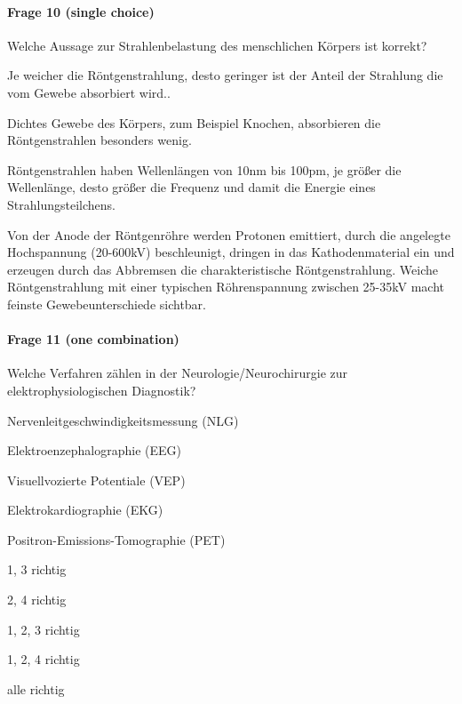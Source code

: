 \paragraph{Frage 10 (single choice)}

Welche Aussage zur Strahlenbelastung des menschlichen Körpers ist korrekt?
\begin{benumerate}
  \item Je weicher die Röntgenstrahlung, desto geringer ist der Anteil der Strahlung die vom Gewebe absorbiert wird..
  \item Dichtes Gewebe des Körpers, zum Beispiel Knochen, absorbieren die Röntgenstrahlen besonders wenig.
  \item Röntgenstrahlen haben Wellenlängen von 10nm bis 100pm, je größer die Wellenlänge, desto größer die Frequenz und damit die Energie eines Strahlungsteilchens.
  \item Von der Anode der Röntgenröhre werden Protonen emittiert, durch die angelegte Hochspannung (20-600kV) beschleunigt, dringen in das Kathodenmaterial ein und erzeugen durch das Abbremsen die charakteristische Röntgenstrahlung.
  \bolditem Weiche Röntgenstrahlung mit einer typischen Röhrenspannung zwischen 25-35kV macht feinste Gewebeunterschiede sichtbar.
\end{benumerate}

\paragraph{Frage 11 (one combination)}

Welche Verfahren zählen in der Neurologie/Neurochirurgie zur elektrophysiologischen Diagnostik?

\begin{minipage}{.7\linewidth}
  \begin{benumerate}
    \item Nervenleitgeschwindigkeitsmessung (NLG)
    \item Elektroenzephalographie (EEG)
    \item Visuellvozierte Potentiale (VEP)
    \item Elektrokardiographie (EKG)
    \item Positron-Emissions-Tomographie (PET)
  \end{benumerate}
\end{minipage}%
\begin{minipage}{.25\linewidth}
  \begin{checklist}[leftmargin=7mm]
    \item 1, 3 richtig
    \item 2, 4 richtig
    \item[\checkedbox] 1, 2, 3 richtig
    \item 1, 2, 4 richtig
    \item alle richtig
  \end{checklist}
\end{minipage}

